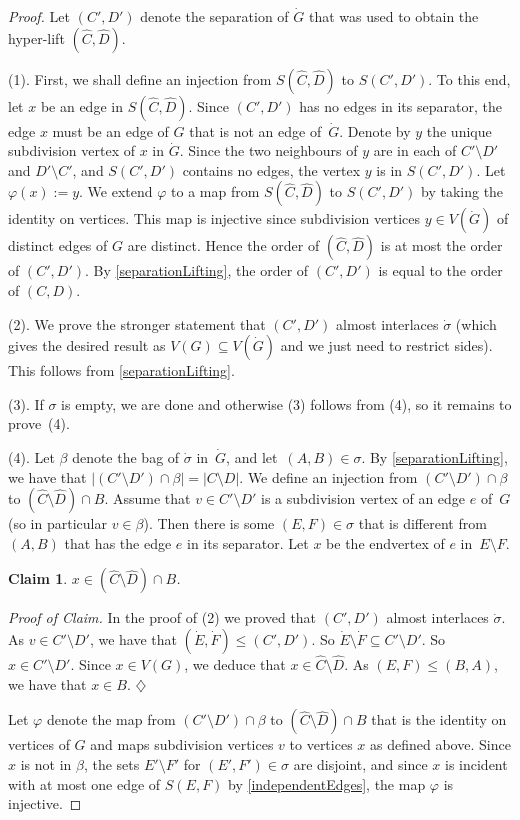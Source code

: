 \documentclass{aic}
\newcommand{\se}{\subseteq}
\newenvironment{cproof}{\noindent\textit{Proof of Claim.}}{\phantom{!}\!\hfill$\diamondsuit$}
\theoremstyle{plain}
\newtheorem{sublem}{Claim}[thm]
\theoremstyle{definition}
\theoremstyle{plain}
\theoremstyle{plain}
\newcommand{\sm}{\setminus}
\renewcommand{\leq}{\leqslant}
\begin{document}
\begin{proof}
Let $(C',D')$ denote the separation of $\dot G$ that was used to obtain the hyper-lift $(\hat C,\hat D)$.

(1). First, we shall define an injection from $S(\hat C,\hat D)$ to $S(C',D')$.
To this end, let $x$ be an edge in  $S(\hat C,\hat D)$. Since $(C',D')$ has no edges in its separator, 
the edge $x$ must be an edge of $G$ that is not an edge of~$\dot G$. 
Denote by $y$ the unique subdivision vertex of $x$ in $\dot G$. 
Since the two neighbours of $y$ are in each of $C'\sm D'$ and $D'\sm C'$, and $S(C',D')$ contains no edges, the vertex $y$ is in $S(C',D')$.
Let $\varphi(x):=y$. 
We extend $\varphi$ to a map from $S(\hat C,\hat D)$ to $S(C',D')$ by taking the identity on vertices. 
This map is injective since subdivision vertices $y\in V(\dot G)$ of distinct edges of $G$ are distinct. 
Hence the order of $(\hat C,\hat D)$ is at most the order of $(C',D')$. 
By \autoref{separationLifting}, the order of $(C',D')$ is equal to the order of $(C,D)$. 

(2). We prove the stronger statement that $(C',D')$ almost interlaces $\dot\sigma$ (which gives the desired result as $V(G)\se V(\dot G)$ and we just need to restrict sides). This follows from \autoref{separationLifting}. 

(3). If $\sigma$ is empty, we are done and otherwise (3) follows from (4), so it remains to prove~(4).

(4). Let $\beta$ denote the bag of $\dot\sigma$ in~$\dot G$, and let~$(A,B)\in\sigma$. 
By \autoref{separationLifting}, we have that $|(C'\sm  D')\cap \beta|= |C\sm D|$. 
We define an injection from $(C'\sm  D')\cap \beta$ to $(\hat C\sm \hat D)\cap B$. 
Assume that $v\in C'\sm D'$ is a subdivision vertex of an edge $e$ of~$G$ (so in particular $v\in\beta$). 
Then there is some $(E,F)\in \sigma$ that is different from $(A,B)$ that has the edge $e$ in its separator. 
Let $x$ be the endvertex of $e$ in~$E\sm F$.
\begin{sublem}
    $x\in (\hat C\sm \hat D)\cap B$.
\end{sublem}
\begin{cproof}
In the proof of (2) we proved that $(C',D')$ almost interlaces $\dot\sigma$. As $v\in C'\sm D'$, we have that $(\dot E,\dot F)\leq (C',D')$. 
So $\dot E\sm \dot F\se C'\sm D'$. 
So $x\in C'\sm D'$. Since $x\in V(G)$, we deduce that  $x\in \hat C\sm \hat D$. As $(E,F)\leq (B,A)$, we have that $x\in B$.
\end{cproof}\medskip

Let $\varphi$ denote the map from $(C'\sm  D')\cap \beta$ to $(\hat C\sm \hat D)\cap B$ that is the identity on vertices of $G$ and maps subdivision vertices $v$ to vertices $x$ as defined above. 
Since $x$ is not in $\beta$, the sets $E'\sm F'$ for $(E',F')\in\sigma$ are disjoint, and since $x$ is incident with at most one edge of $S(E,F)$ by \autoref{independentEdges}, the map $\varphi$ is injective. 
\end{proof}
\end{document}
